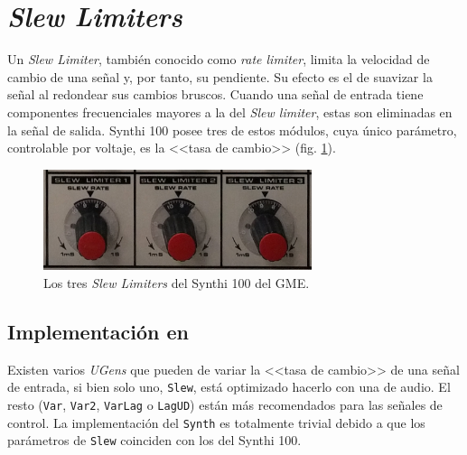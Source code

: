 \section[\textit{Slew Limiters}]{\textit{Slew Limiters}}
\label{sec:slew_limiters}

Un \textit{Slew Limiter}, también conocido como \textit{rate limiter}, limita la velocidad de cambio de una señal y, por tanto, su pendiente. Su efecto es el de suavizar la señal al redondear sus cambios bruscos. Cuando una señal de entrada tiene componentes frecuenciales mayores a la del \textit{Slew limiter}, estas son eliminadas en la señal de salida. Synthi 100 posee tres de estos módulos, cuya único parámetro, controlable por voltaje, es la <<tasa de cambio>> (fig. \ref{fig:slew_limiters}). 

\begin{figure}
	\centering
	\includegraphics[width=0.7\textwidth]{images/slew_limiters}
	\caption[\textit{Slew Limiters}]{Los tres \textit{Slew Limiters} del Synthi 100 del GME.}
	\label{fig:slew_limiters}
\end{figure}

\subsection{Implementación en \appName}
Existen varios \textit{UGens} que pueden de variar la <<tasa de cambio>> de una señal de entrada, si bien solo uno, \texttt{Slew}, está optimizado hacerlo con una de audio. El resto (\texttt{Var}, \texttt{Var2}, \texttt{VarLag} o \texttt{LagUD}) están más recomendados para las señales de control. La implementación del \texttt{Synth} es totalmente trivial debido a que los parámetros de \texttt{Slew} coinciden con los del Synthi 100. 